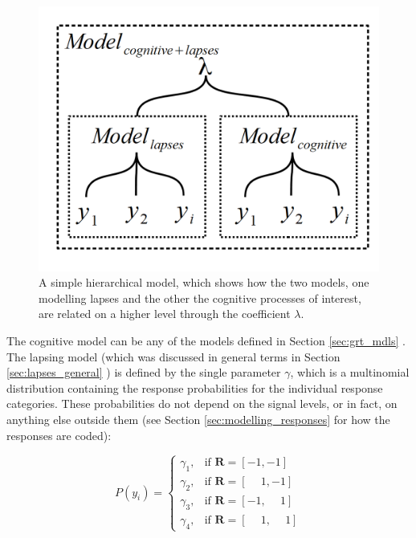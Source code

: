 \documentclass{article}\usepackage{knitr}
\begin{document}
\begin{figure}[!htb]
\begin{center}
\includegraphics[scale=0.75]{Basic_hierarchical_mixture_model}
\end{center}
\caption{A simple hierarchical model, which shows how the two models, one modelling lapses and the other the cognitive processes of interest, are related on a higher level through the coefficient $\lambda$.}
\label{fig:Basic_hierarchical_model}
\end{figure}

The cognitive model can be any of the models defined in Section \ref{sec:grt_mdls} \textit{}. The lapsing model (which was discussed in general terms in Section \ref{sec:lapses_general} \textit{}) is defined by the single parameter $\gamma$, which is a multinomial distribution containing the response probabilities for the individual response categories. These probabilities do not depend on the signal levels, or in fact, on anything else outside them (see Section \ref{sec:modelling_responses} \textit{} for how the responses are coded):

\begin{equation}
P(y_i)=
\begin{cases}
  \gamma_1, & \text{if } \bm{R} = [-1, -1]\\
  \gamma_2, & \text{if } \bm{R} = [\phantom{-}1, -1]\\
  \gamma_3, & \text{if } \bm{R} = [-1, \phantom{-}1]\\
  \gamma_4, & \text{if } \bm{R} = [\phantom{-}1, \phantom{-}1]
\end{cases}
\end{equation}
\end{document}
